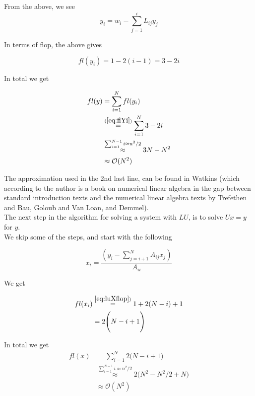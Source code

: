\documentclass{article}
\begin{document}
From the above, we see
\begin{equation}
y_i= w_i -\sum_{j=1}^{i}L_{ij}y_j
\end{equation}

In terms of flop, the above gives

\begin{equation}\label{eq:flYi}
fl(y_i) = 1 - 2(i - 1) = 3-2i
\end{equation}

In total we get

\begin{subequations}
	\begin{align}
	fl(y) &= \sum_{i=1}^{N} fl(y_i)\\
	&\stackrel{(\ref{eq:flYi})}{=} \sum_{i=1}^{N} 3 -2i\\
	&\stackrel{\sum_{i=1}^{N-1} i\approx n^2/2}{\approx}{3N - N^2  }\\
	&\approx \mathcal{O}(N^2)\label{eq:luForward}
	\end{align}
\end{subequations}

The approximation used in the 2nd last line, can be found in Watkins \cite{watkins} (which according to the author is a book on numerical linear algebra in the gap between standard introduction texts and the numerical linear algebra texts by Trefethen and Bau, Goloub and Van Loan, and Demmel).\\

The next step in the algorithm for solving a system with $LU$, is to solve $Ux = y$ for $y$.\\

We skip some of the steps, and start with the following

\begin{equation}\label{eq:luXflop}
x_i = \frac{(y_i - \sum_{j=i+1}^N A_{ij} x_j)}{A_{ii}}
\end{equation}

We get

\begin{align}
fl(x_i) & \stackrel{\ref{eq:luXflop})}{=} 1 + 2(N - i) + 1 \\
&= 2\Bigg(N-i + 1 \Bigg)
\end{align}

In total we get
\begin{subequations}
	\begin{align}
	fl(x) &= \sum_{i=1}^N 2\Bigg(N-i + 1 \Bigg)\\
	&\stackrel{\sum_{i=1}^{N-1} i\approx n^2/2}{\approx} 2 \Bigg( N^2 - N^2/2 + N\Bigg)\\
	&\approx \mathcal{O}(N^2)\label{eq:luBackwardOrder}
	\end{align}
\end{subequations}
\end{document}
